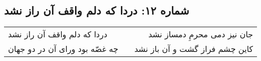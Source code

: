 \begin{center}
\section*{شماره ۱۲: دردا که دلم واقف آن راز نشد}
\label{sec:012}
\begin{longtable}{l p{0.5cm} r}
دردا که دلم واقف آن راز نشد
&&
جان نیز دمی محرمِ دمساز نشد
\\
چه غصّه بود ورای آن در دو جهان
&&
کاین چشم فراز گشت و آن باز نشد
\\
\end{longtable}
\end{center}
